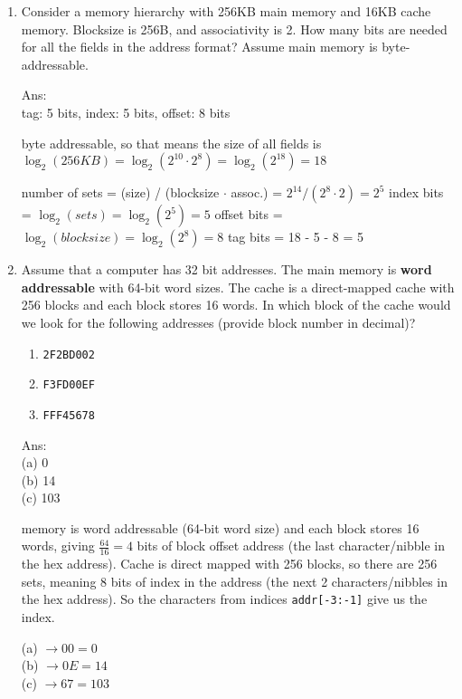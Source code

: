 \documentclass[12pt]{article}
\begin{document}
    \begin{enumerate}
        \item Consider a memory hierarchy with 256KB main memory and 16KB cache memory. Blocksize is 256B, and associativity 
        is 2. How many bits are needed for all the fields in the address format? Assume main memory is byte-addressable.

        Ans:\\
        tag: 5 bits, index: 5 bits, offset: 8 bits

        byte addressable, so that means the size of all fields is $\log_2(256KB) = \log_2(2^{10} \cdot 2^8) = \log_2(2^{18}) = 18$

        number of sets = (size) / (blocksize $\cdot$ assoc.) = $2^{14} / (2^8 \cdot 2) = 2^5$
        index bits = $\log_2(sets) = \log_2(2^5) = 5$
        offset bits = $\log_2(blocksize) = \log_2(2^8) = 8$
        tag bits = 18 - 5 - 8 = 5

        \item Assume that a computer has 32 bit addresses. The main memory is \textbf{word addressable} with 64-bit word 
        sizes. The cache is a direct-mapped cache with 256 blocks and each block stores 16 words. In which block of the 
        cache would we look for the following addresses (provide block number in decimal)?

        \begin{enumerate}
            \item \texttt{2F2BD002}
            \item \texttt{F3FD00EF}
            \item \texttt{FFF45678}
        \end{enumerate}

        Ans:\\
        (a) 0\\
        (b) 14\\
        (c) 103

        memory is word addressable (64-bit word size) and each block stores 16 words, giving $\frac{64}{16} = 4$ bits of 
        block offset address (the last character/nibble in the hex address). Cache is direct mapped with 256 blocks, so 
        there are 256 sets, meaning 8 bits of index in the address (the next 2 characters/nibbles in the hex address). 
        So the characters from indices \texttt{addr[-3:-1]} give us the index.

        (a) $\longrightarrow 00 = 0$\\
        (b) $\longrightarrow 0E = 14$\\
        (c) $\longrightarrow 67 = 103$


\end{enumerate}
\end{document}
